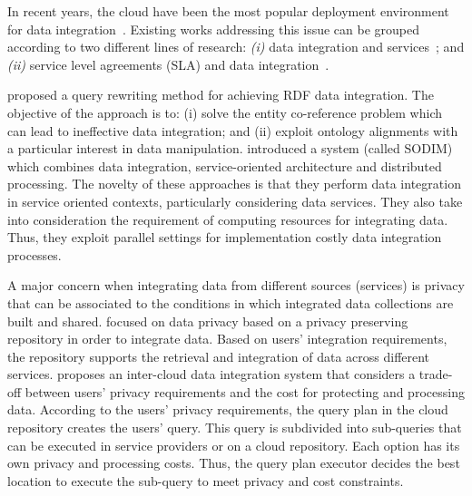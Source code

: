 In recent years, the cloud have been the most popular deployment environment for data integration~\cite{Carvalho2015}. Existing works addressing this issue can be grouped according to two different lines of research:
\textit{(i)} data integration and services~\cite{Correndo2010,ElSheikh2013,Tian2010,YauY08}; and
\textit{(ii)} service level agreements (SLA) and data integration~\cite{Bennani2014,Nie07}. 
 
\cite{Correndo2010} proposed a query rewriting method for achieving RDF data integration. %
The objective of the approach is to: (i) solve the entity co-reference problem which can lead to ineffective data integration; and (ii) exploit ontology alignments with a particular interest in data manipulation. 
\cite{ElSheikh2013} introduced a system (called SODIM) which combines data integration, service-oriented architecture and distributed processing. %
The novelty of these approaches is that they perform data integration in service oriented contexts, particularly considering data services. They also take into consideration the requirement of computing resources for integrating data. Thus, they exploit parallel settings for implementation costly data integration processes. 

A major concern when integrating data from different sources (services) is privacy that can be associated to the conditions in which integrated data collections are built and shared.
\cite{YauY08} focused on data privacy based on  a privacy preserving repository in order to integrate data. 
Based on users' integration requirements, the repository supports the retrieval and integration of
data across different services. 
\cite{Tian2010} proposes an inter-cloud data integration system that considers a trade-off between users' privacy requirements and the cost for protecting and processing data. According to the users' privacy requirements, the query plan in the cloud repository creates the users' query. This query is subdivided into sub-queries that can
be executed in service providers or on a cloud repository. Each option has its own  privacy and processing costs.
Thus, the query plan executor decides the best location to execute the sub-query to meet privacy and cost constraints.

